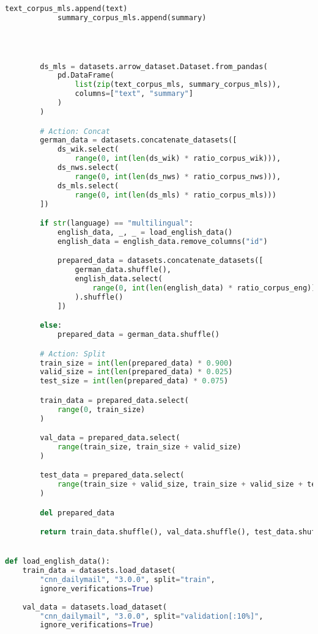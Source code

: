 \begin{lstlisting}[language=Python, caption=Hilfsmethoden]
            text_corpus_mls.append(text)
            summary_corpus_mls.append(summary)
            



        ds_mls = datasets.arrow_dataset.Dataset.from_pandas(
            pd.DataFrame(
                list(zip(text_corpus_mls, summary_corpus_mls)),
                columns=["text", "summary"]
            )
        )

        # Action: Concat
        german_data = datasets.concatenate_datasets([
            ds_wik.select(
                range(0, int(len(ds_wik) * ratio_corpus_wik))),
            ds_nws.select(
                range(0, int(len(ds_nws) * ratio_corpus_nws))),
            ds_mls.select(
                range(0, int(len(ds_mls) * ratio_corpus_mls)))
        ])

        if str(language) == "multilingual":
            english_data, _, _ = load_english_data()
            english_data = english_data.remove_columns("id")

            prepared_data = datasets.concatenate_datasets([
                german_data.shuffle(),
                english_data.select(
                    range(0, int(len(english_data) * ratio_corpus_eng))
                ).shuffle()
            ])

        else:
            prepared_data = german_data.shuffle()

        # Action: Split
        train_size = int(len(prepared_data) * 0.900)
        valid_size = int(len(prepared_data) * 0.025)
        test_size = int(len(prepared_data) * 0.075)

        train_data = prepared_data.select(
            range(0, train_size)
        )

        val_data = prepared_data.select(
            range(train_size, train_size + valid_size)
        )

        test_data = prepared_data.select(
            range(train_size + valid_size, train_size + valid_size + test_size)
        )

        del prepared_data

        return train_data.shuffle(), val_data.shuffle(), test_data.shuffle()


def load_english_data():
    train_data = datasets.load_dataset(
        "cnn_dailymail", "3.0.0", split="train",
        ignore_verifications=True)
        
    val_data = datasets.load_dataset(
        "cnn_dailymail", "3.0.0", split="validation[:10%]",
        ignore_verifications=True)
        

\end{lstlisting}
